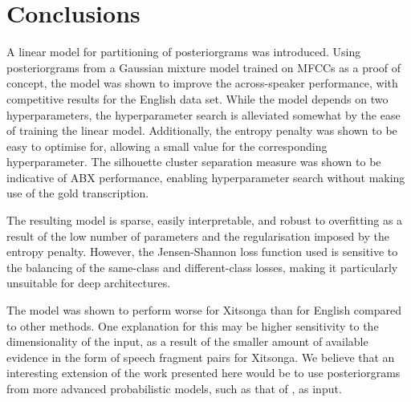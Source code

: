 \section{Conclusions}
A linear model for partitioning of posteriorgrams was introduced.
Using posteriorgrams from a Gaussian mixture model trained on MFCCs as a proof of concept, the model was shown to improve the across-speaker performance, with competitive  results for the English data set.
While the model depends on two hyperparameters, the hyperparameter search is alleviated somewhat by the ease of training the linear model.
Additionally, the entropy penalty was shown to be easy to optimise for, allowing a small value for the corresponding hyperparameter.
The silhouette cluster separation measure was shown to be indicative of ABX performance, enabling hyperparameter search without making use of the gold transcription.

The resulting model is sparse, easily interpretable, and robust to overfitting as a result of the low number of parameters and the regularisation imposed by the entropy penalty.
However, the Jensen-Shannon loss function used is sensitive to the balancing of the same-class and different-class losses, making it particularly unsuitable for deep architectures.

The model was shown to perform worse for Xitsonga than for English compared to other methods.
One explanation for this may be higher sensitivity to the dimensionality of the input, as a result of the smaller amount of available evidence in the form of speech fragment pairs for Xitsonga.
We believe that an interesting extension of the work presented here would be to use posteriorgrams from more advanced probabilistic models, such as that of \textcite{chen2015parallel}, as input.

%
%



